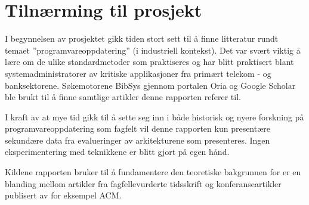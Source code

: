 
\section{Tilnærming til prosjekt}

I begynnelsen av prosjektet gikk tiden stort sett til å finne litteratur rundt temaet ''programvareoppdatering'' (i industriell kontekst). Det var svært viktig å lære om de ulike standardmetoder som praktiseres og har blitt praktisert blant systemadministratorer av kritiske applikasjoner fra primært telekom - og banksektorene. Søkemotorene BibSys gjennom portalen Oria og Google Scholar ble brukt til å finne samtlige artikler denne rapporten referer til.

I kraft av at mye tid gikk til å sette seg inn i både historisk og nyere forskning på programvareoppdatering som fagfelt vil denne rapporten kun presentære sekundære data fra evalueringer av arkitekturene som presenteres. Ingen eksperimentering med teknikkene er blitt gjort på egen hånd.

Kildene rapporten bruker til å fundamentere den teoretiske bakgrunnen for er en blanding mellom artikler fra fagfellevurderte tidsskrift og konferanseartikler publisert av for eksempel ACM.
